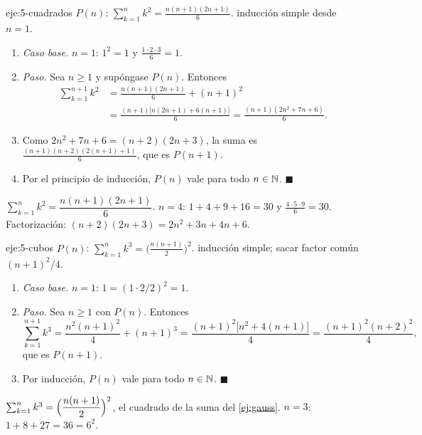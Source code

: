\begin{solucion}{eje:5-cuadrados}
\datos $P(n)$: $\sum_{k=1}^{n}k^{2}=\frac{n(n+1)(2n+1)}{6}$.
\planteamiento inducción simple desde $n=1$.
\pasos
\begin{enumerate}[label=\arabic*.]
  \item \emph{Caso base.} $n=1$: $1^{2}=1$ y $\frac{1\cdot 2\cdot 3}{6}=1$.
  \item \emph{Paso.} Sea $n\ge 1$ y supóngase $P(n)$. Entonces
  \[
  \begin{aligned}
  \sum_{k=1}^{n+1}k^{2}&=\frac{n(n+1)(2n+1)}{6}+(n+1)^{2}\\
  &=\frac{(n+1)\bigl[n(2n+1)+6(n+1)\bigr]}{6}=\frac{(n+1)(2n^{2}+7n+6)}{6}.
  \end{aligned}
  \]
  \item Como $2n^{2}+7n+6=(n+2)(2n+3)$, la suma es $\frac{(n+1)(n+2)(2(n+1)+1)}{6}$, que es $P(n+1)$.
  \item Por el principio de inducción, $P(n)$ vale para todo $n\in\mathbb{N}$. $\blacksquare$
\end{enumerate}
\resultado $\sum_{k=1}^{n}k^{2}=\dfrac{n(n+1)(2n+1)}{6}$.
\comprobacion $n=4$: $1+4+9+16=30$ y $\frac{4\cdot5\cdot9}{6}=30$. Factorización: $(n+2)(2n+3)=2n^{2}+3n+4n+6$.
\end{solucion}

\begin{solucion}{eje:5-cubos}
\datos $P(n)$: $\sum_{k=1}^{n}k^{3}=\bigl(\frac{n(n+1)}{2}\bigr)^{2}$.
\planteamiento inducción simple; sacar factor común $(n+1)^{2}/4$.
\pasos
\begin{enumerate}[label=\arabic*.]
  \item \emph{Caso base.} $n=1$: $1=(1\cdot 2/2)^{2}=1$.
  \item \emph{Paso.} Sea $n\ge 1$ con $P(n)$. Entonces
  \[
  \sum_{k=1}^{n+1}k^{3}=\frac{n^{2}(n+1)^{2}}{4}+(n+1)^{3}=\frac{(n+1)^{2}\bigl[n^{2}+4(n+1)\bigr]}{4}=\frac{(n+1)^{2}(n+2)^{2}}{4},
  \]
  que es $P(n+1)$.
  \item Por inducción, $P(n)$ vale para todo $n\in\mathbb{N}$. $\blacksquare$
\end{enumerate}
\resultado $\sum_{k=1}^{n}k^{3}=\Bigl(\dfrac{n(n+1)}{2}\Bigr)^{2}$, el cuadrado de la suma del \cref{ej:gauss}.
\comprobacion $n=3$: $1+8+27=36=6^{2}$.
\end{solucion}

